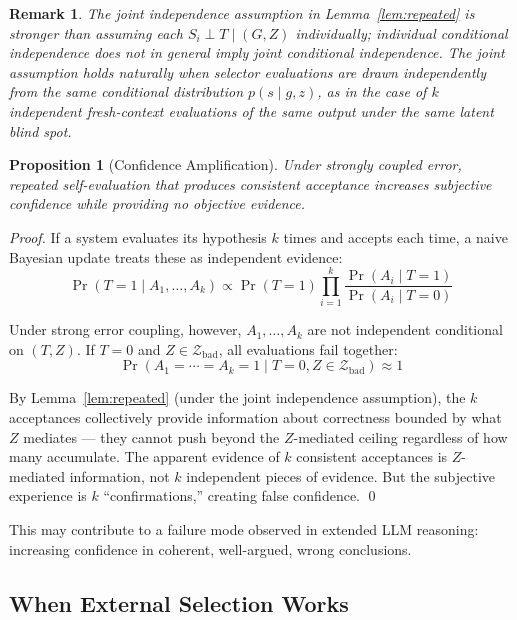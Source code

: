 \documentclass[11pt]{article}
\newtheorem{proposition}[theorem]{Proposition}
\newtheorem{remark}[theorem]{Remark}
\begin{document}
\begin{remark}
The joint independence assumption in Lemma~\ref{lem:repeated} is stronger than assuming
each $S_i \perp T \mid (G,Z)$ individually; individual conditional independence does not in
general imply joint conditional independence. The joint assumption holds naturally when
selector evaluations are drawn independently from the same conditional distribution
$p(s \mid g, z)$, as in the case of $k$ independent fresh-context evaluations of the same
output under the same latent blind spot.
\end{remark}

\begin{proposition}[Confidence Amplification]
Under strongly coupled error, repeated self-evaluation that produces consistent acceptance
increases subjective confidence while providing no objective evidence.
\end{proposition}

\begin{proof}
If a system evaluates its hypothesis $k$ times and accepts each time, a naive Bayesian
update treats these as independent evidence:
\begin{equation}
\Pr(T = 1 \mid A_1, \ldots, A_k) \propto \Pr(T = 1) \prod_{i=1}^{k}
\frac{\Pr(A_i \mid T = 1)}{\Pr(A_i \mid T = 0)}
\end{equation}

Under strong error coupling, however, $A_1, \ldots, A_k$ are not independent conditional on
$(T, Z)$. If $T = 0$ and $Z \in \mathcal{Z}_{\mathrm{bad}}$, all evaluations fail together:
\begin{equation}
\Pr(A_1 = \cdots = A_k = 1 \mid T = 0, Z \in \mathcal{Z}_{\mathrm{bad}}) \approx 1
\end{equation}

By Lemma~\ref{lem:repeated} (under the joint independence assumption), the $k$ acceptances
collectively provide information about correctness bounded by what $Z$ mediates --- they
cannot push beyond the $Z$-mediated ceiling regardless of how many accumulate. The apparent
evidence of $k$ consistent acceptances is $Z$-mediated information, not $k$ independent
pieces of evidence. But the subjective experience is $k$ ``confirmations,'' creating false
confidence.
\qed
\end{proof}

This may contribute to a failure mode observed in extended LLM reasoning: increasing
confidence in coherent, well-argued, wrong conclusions.

\subsection{When External Selection Works}
\end{document}
